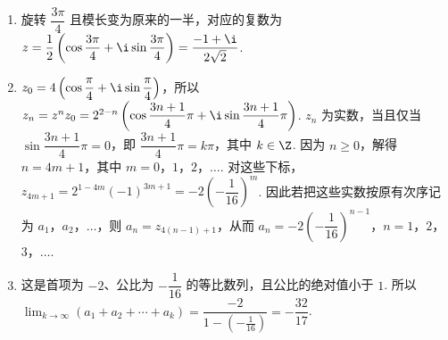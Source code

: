 \begin{solution}
\begin{enumerate}
\item 旋转 \(\dfrac{3\pi}{4}\) 且模长变为原来的一半，对应的复数为
\(z=\dfrac12\left(\cos\dfrac{3\pi}{4}+\i\sin\dfrac{3\pi}{4}\right)=\dfrac{-1+\i}{2\sqrt2}\).
\item \(z_0=4\left(\cos\dfrac\pi4+\i\sin\dfrac\pi4\right)\)，所以
\(z_n=z^nz_0=2^{2-n}\left(\cos\dfrac{3n+1}{4}\pi+\i\sin\dfrac{3n+1}{4}\pi\right)\).
\(z_n\) 为实数，当且仅当 \(\sin\dfrac{3n+1}{4}\pi=0\)，即 \(\dfrac{3n+1}{4}\pi=k\pi\)，其中 \(k\in\Z\). 因为 \(n\geqslant0\)，解得 \(n=4m+1\)，其中 \(m=0\)，\(1\)，\(2\)，\(\dots\). 对这些下标，
\(z_{4m+1}=2^{1-4m}(-1)^{3m+1}=-2\left(-\dfrac1{16}\right)^m\).
因此若把这些实数按原有次序记为 \(a_1\)，\(a_2\)，\(\dots\)，则 \(a_n=z_{4(n-1)+1}\)，从而
\(a_n=-2\left(-\dfrac1{16}\right)^{n-1}\)，\(n=1\)，\(2\)，\(3\)，\(\dots\).
\item 这是首项为 \(-2\)、公比为 \(-\dfrac1{16}\) 的等比数列，且公比的绝对值小于 \(1\). 所以
\(\displaystyle\lim_{k\to\infty}(a_1+a_2+\cdots+a_k)=\dfrac{-2}{1-\left(-\frac1{16}\right)}=-\dfrac{32}{17}\).
\end{enumerate}
\end{solution}

